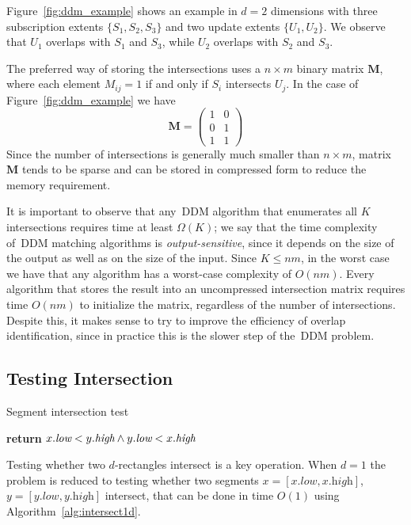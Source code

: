 \documentclass[10pt, conference, compsocconf]{IEEEtran}
\begin{document}
Figure~\ref{fig:ddm_example} shows an example in $d=2$ dimensions with
three subscription extents $\{S_1, S_2, S_3\}$ and two update extents
$\{U_1, U_2\}$. We observe that $U_1$ overlaps with $S_1$ and $S_3$,
while $U_2$ overlaps with $S_2$ and $S_3$.

The preferred way of storing the intersections uses a $n \times m$
binary matrix $\mathbf{M}$, where each element $M_{ij} = 1$ if and
only if $S_i$ intersects $U_j$. In the case of
Figure~\ref{fig:ddm_example} we have
\[
\mathbf{M} = \left(\begin{array}{cc}
1 & 0 \\
0 & 1 \\
1 & 1 
\end{array}\right)
\]
Since the number of intersections is generally much smaller than $n
\times m$, matrix $\mathbf{M}$ tends to be sparse and can be stored in
compressed form to reduce the memory requirement.

It is important to observe that any~\ac{DDM} algorithm that enumerates
all $K$ intersections requires time at least $\Omega(K)$; we say that
the time complexity of~\ac{DDM} matching algorithms is
\emph{output-sensitive}, since it depends on the size of the output as
well as on the size of the input. Since $K \leq nm$, in the worst case
we have that any algorithm has a worst-case complexity of
$O(nm)$. Every algorithm that stores the result into an uncompressed
intersection matrix requires time $O(nm)$ to initialize the matrix,
regardless of the number of intersections. Despite this, it makes
sense to try to improve the efficiency of overlap identification,
since in practice this is the slower step of the~\ac{DDM} problem.

\subsection{Testing Intersection}\label{sec:testing-intersection}

\begin{algorithm}[t]
\caption{Segment intersection test}\label{alg:intersect1d}
\begin{algorithmic}
\State \textbf{return} $x.\emph{low} < y.\emph{high} \wedge y.\emph{low} < x.\emph{high}$
\EndFunction
\end{algorithmic}
\end{algorithm}

Testing whether two $d$-rectangles intersect is a key operation. When
$d=1$ the problem is reduced to testing whether two segments
$x=[x.\textit{low},x.\textit{high}]$, $y=[y.\textit{low},
  y.\textit{high}]$ intersect, that can be done in time $O(1)$ using
Algorithm~\ref{alg:intersect1d}.
\end{document}
